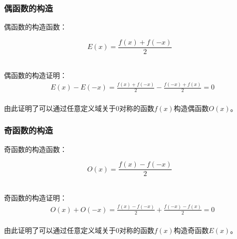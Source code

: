 \documentclass[UTF8]{ctexart}
\begin{document}
\subsubsection{偶函数的构造}
    \setcounter{equation}{0}
    偶函数的构造函数：
    \begin{large}
        \begin{equation*}
            E(x)=\frac{f(x)+f(-x)}{2}
        \end{equation*}
    \end{large}\\
    偶函数的构造证明：
    \begin{align}
        &E(x)-E(-x)=\frac{f(x)+f(-x)}{2}-\frac{f(-x)+f(x)}{2}=0
    \end{align}\\
    由此证明了可以通过任意定义域关于$0$对称的函数$f(x)$构造偶函数$O(x)$。

\subsubsection{奇函数的构造}
    \setcounter{equation}{0}
    奇函数的构造函数：
    \begin{large}
        \begin{equation*}
            O(x)=\frac{f(x)-f(-x)}{2}
        \end{equation*}
    \end{large}\\
    奇函数的构造证明：
    \begin{align}
        &O(x)+O(-x)=\frac{f(x)-f(-x)}{2}+\frac{f(-x)-f(x)}{2}=0
    \end{align}\\
    由此证明了可以通过任意定义域关于$0$对称的函数$f(x)$构造奇函数$E(x)$。

\newpage
\end{document}
